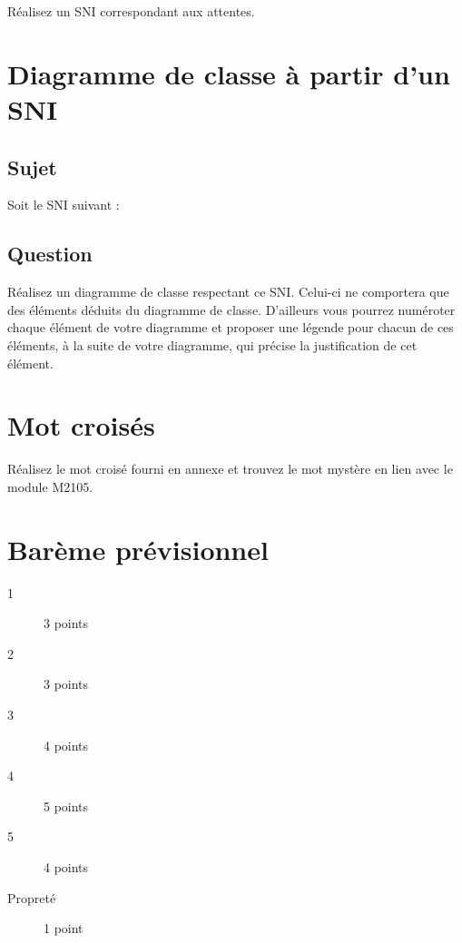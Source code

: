 \documentclass[12pt]{article}
\def\dc{\textsf{diagramme de classe}}
\def\sni{\textsf{SNI}}
\begin{document}
Réalisez un \sni{} correspondant aux attentes.

\section{Diagramme de classe à partir d'un SNI}

\subsection*{Sujet}

Soit le \sni{} suivant :


\subsection*{Question}

Réalisez un \dc{} respectant ce \sni. Celui-ci ne comportera que des éléments déduits du \dc. D'ailleurs vous pourrez numéroter chaque élément de votre diagramme et proposer une légende pour chacun de ces éléments, à la suite de votre diagramme, qui
précise la justification de cet élément.

\section{Mot croisés}

Réalisez le mot croisé fourni en annexe et trouvez le mot mystère en lien avec le module M2105.

\section*{Bar\`eme prévisionnel}

\begin{description}
\item[1] 3 points
\item[2] 3 points
\item[3] 4 points
\item[4] 5 points
\item[5] 4 points
\item[Propret\'e]  1 point
\end{description}
\end{document}
